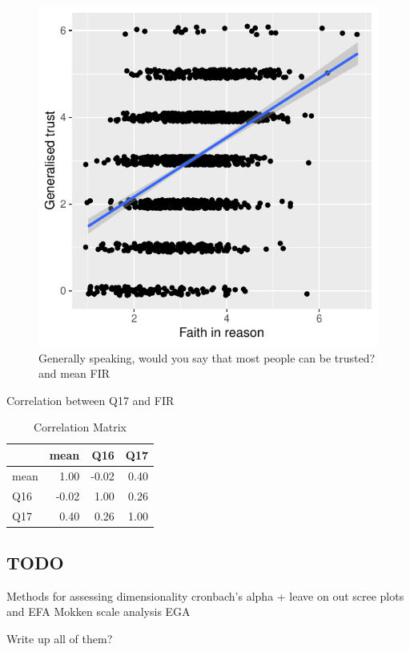 \documentclass[
  ,jou,floatsintext]{apa6}
\begin{document}
\begin{figure}

{\centering \includegraphics[width=0.75\linewidth]{faithinreason_files/figure-latex/generalisetrust-1} 

}

\caption{Generally speaking, would you say that most people can be trusted? and mean FIR}\label{fig:generalisetrust}
\end{figure}

Correlation between Q17 and FIR

\begin{table}

\caption{\label{tab:correlations}Correlation Matrix}
\centering
\begin{tabular}[t]{l|r|r|r}
\hline
  & mean & Q16 & Q17\\
\hline
mean & 1.00 & -0.02 & 0.40\\
\hline
Q16 & -0.02 & 1.00 & 0.26\\
\hline
Q17 & 0.40 & 0.26 & 1.00\\
\hline
\end{tabular}
\end{table}

\hypertarget{todo}{%
\subsection{TODO}\label{todo}}

Methods for assessing dimensionality
cronbach's alpha + leave on out
scree plots and EFA
Mokken scale analysis
EGA

Write up all of them?
\end{document}
